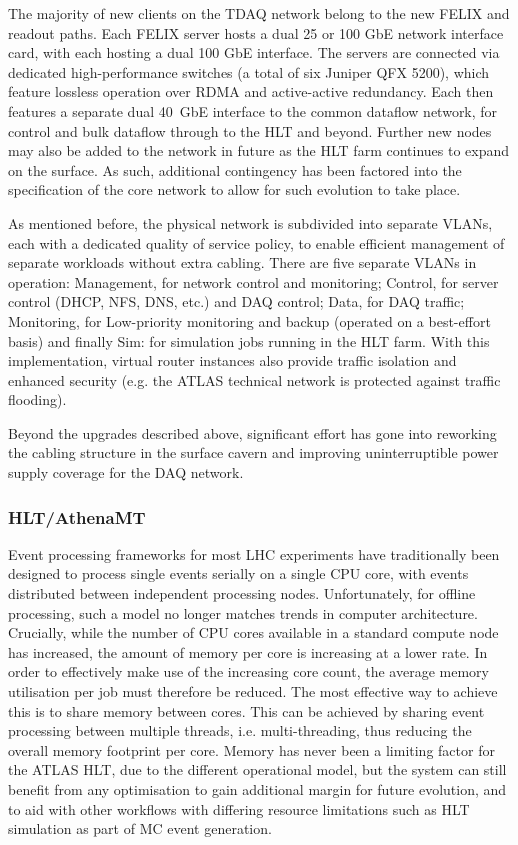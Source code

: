\documentclass[cernpreprint, atlasdraft=false, UKenglish,british,orcidlogo, texmf, orcidlogo]{atlasdoc}
\begin{document}
The majority of new clients on the \gls{TDAQ} network belong to the new \gls{FELIX} and \swrod readout paths. Each \gls{FELIX} server hosts a dual 25 or 100 \gls{GbE} network interface card, with each \swrod hosting a dual 100 \gls{GbE} interface. The servers are connected via dedicated high-performance switches (a total of six Juniper QFX 5200), which feature lossless operation over \gls{RDMA} and active-active redundancy. Each \swrod then features a separate dual 40~\gls{GbE} interface to the common dataflow network, for control and bulk dataflow through to the \gls{HLT} and beyond. Further new nodes may also be added to the network in future as the \gls{HLT} farm continues to expand on the surface. As such, additional contingency has been factored into the specification of the core network to allow for such evolution to take place.
 
As mentioned before, the physical network is subdivided into separate \glspl{VLAN}, each with a dedicated quality of service policy, to enable efficient management of separate workloads without extra cabling. There are five separate \glspl{VLAN} in operation: Management, for network control and monitoring; Control, for server control (DHCP, NFS, DNS, etc.) and \gls{DAQ} control; Data, for \gls{DAQ} traffic; Monitoring, for Low-priority monitoring and backup (operated on a best-effort basis)
and finally Sim: for simulation jobs running in the \gls{HLT} farm. With this implementation, virtual router instances also provide traffic isolation and enhanced security (e.g. the ATLAS technical network is protected against traffic flooding).
 
Beyond the upgrades described above, significant effort has gone into reworking the cabling structure in the surface cavern and improving uninterruptible power supply coverage for the \gls{DAQ} network.
 
\subsubsection{HLT/AthenaMT}
\label{subsubsec:tdaq_daq_hlt_athenamt}
 
Event processing frameworks for most \gls{LHC} experiments have traditionally been designed to process single events serially on a single \gls{CPU} core, with events distributed between independent processing nodes. Unfortunately, for offline processing, such a model no longer matches trends in computer architecture. Crucially, while the number of \gls{CPU} cores available in a standard compute node has increased, the amount of memory per core is increasing at a lower rate. In order to effectively make use of the increasing core count, the average memory utilisation per job must therefore be reduced. The most effective way to achieve this is to share memory between cores. This can be achieved by sharing event processing between multiple threads, i.e. multi-threading, thus reducing the overall memory footprint per core. Memory has never been a limiting factor for the ATLAS \gls{HLT}, due to the different operational model, but the system can still benefit from any optimisation to gain additional margin for future evolution, and to aid with other workflows with differing resource limitations such as HLT simulation as part of MC event generation.
 
\end{document}
